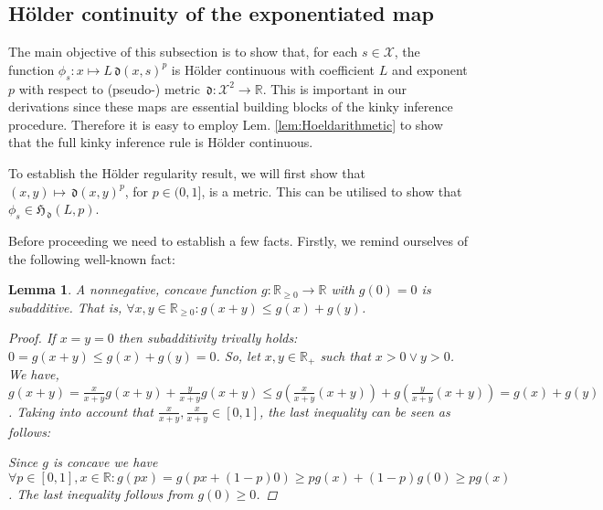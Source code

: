 \documentclass{article} %
\newtheorem{lem}[thm]{Lemma}
\theoremstyle{definition}
\theoremstyle{remark}
\newtheorem{ex}[thm]{\textbf{Example}}
\newcommand{\Real}{\mathbb R}
\newcommand{\inspace}{\ensuremath{ \mathcal X}}
\newcommand{\metric}{\, \mathfrak{d}} %
\newcommand{\hoelset}[3]{\mathfrak{H}_{#2}(#1,#3)}
\begin{document}


\subsection{H\"older continuity of the exponentiated map }

The main objective of this subsection is to show that, for each $s \in \inspace$, the function $\phi_s: x \mapsto L \metric(x,s)^p$ is H\"older continuous with coefficient $L$ and exponent $p$ with respect to (pseudo-) metric $\metric: \inspace^2 \to \Real$. This is important in our derivations since these maps are essential building blocks of the kinky inference procedure. Therefore it is easy to employ Lem. \ref{lem:Hoeldarithmetic} to show that the full kinky inference rule is H\"older continuous.

To establish the H\"older regularity result, we will first show that $(x,y) \mapsto \metric(x,y)^p$, for $p \in (0,1] $, is a metric.  This can be utilised to show that
$\phi_s \in \hoelset L \metric p$.




Before proceeding we need to establish a few facts. 
Firstly, we remind ourselves of the following well-known fact:
\begin{lem} \label{lem:pd_n_concave_subadditive}
A nonnegative, concave function $g:\Real_{\geq 0} \to \Real$ with $g(0) = 0$ is subadditive. 
That is, $\forall x,y \in \Real_{\geq 0}: g(x+y) \leq g(x) + g(y)$. 
 \begin{proof}
If $x = y = 0$ then subadditivity trivally holds:  $0=g(x+y) \leq g(x) + g(y) = 0$.
So, let $x, y \in \Real_+$ such that $x >0 \vee y >0$.
We have, $g( x +y) = \frac{x}{x+y} g(x+y) + \frac{y}{x+y} g(x+y) \leq g(\frac{x}{x+y} (x+y) ) +  g(\frac{y}{x+y}(x+y)) = g(x) + g(y)$.
Taking into account that $\frac{x}{x+y}, \frac{x}{x+y} \in [0,1]$, the last inequality can be seen as follows:

 Since $g$ is concave we have 
$\forall p \in [0,1], x \in \Real: g(p x) =  g(px + (1-p) 0) \geq p g(x) + (1-p) g(0) \geq p g(x)  $. The last inequality follows from $g(0) \geq 0$.
\end{proof}
\end{lem}
\end{document}
